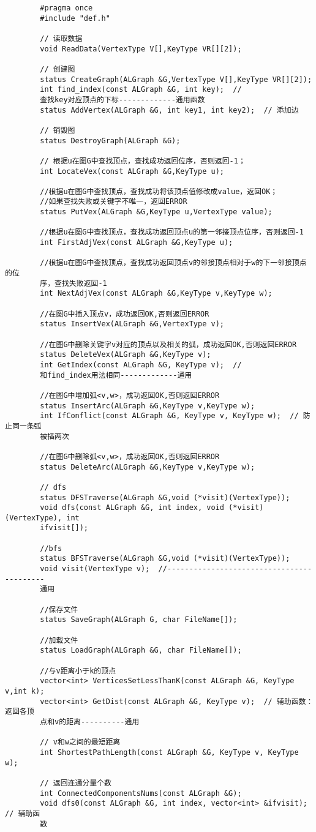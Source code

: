 \documentclass[supercite]{Experimental_Report}
\begin{document}
	\begin{lstlisting}
		#pragma once
		#include "def.h"
		
		// 读取数据
		void ReadData(VertexType V[],KeyType VR[][2]);
		
		// 创建图
		status CreateGraph(ALGraph &G,VertexType V[],KeyType VR[][2]);
		int find_index(const ALGraph &G, int key);  // 
		查找key对应顶点的下标-------------通用函数
		status AddVertex(ALGraph &G, int key1, int key2);  // 添加边
		
		// 销毁图
		status DestroyGraph(ALGraph &G);
		
		// 根据u在图G中查找顶点，查找成功返回位序，否则返回-1；
		int LocateVex(const ALGraph &G,KeyType u);
		
		//根据u在图G中查找顶点，查找成功将该顶点值修改成value，返回OK；
		//如果查找失败或关键字不唯一，返回ERROR
		status PutVex(ALGraph &G,KeyType u,VertexType value);
		
		//根据u在图G中查找顶点，查找成功返回顶点u的第一邻接顶点位序，否则返回-1
		int FirstAdjVex(const ALGraph &G,KeyType u);
		
		//根据u在图G中查找顶点，查找成功返回顶点v的邻接顶点相对于w的下一邻接顶点的位
		序，查找失败返回-1
		int NextAdjVex(const ALGraph &G,KeyType v,KeyType w);
		
		//在图G中插入顶点v，成功返回OK,否则返回ERROR
		status InsertVex(ALGraph &G,VertexType v);
		
		//在图G中删除关键字v对应的顶点以及相关的弧，成功返回OK,否则返回ERROR
		status DeleteVex(ALGraph &G,KeyType v);
		int GetIndex(const ALGraph &G, KeyType v);  // 
		和find_index用法相同-------------通用
		
		//在图G中增加弧<v,w>，成功返回OK,否则返回ERROR
		status InsertArc(ALGraph &G,KeyType v,KeyType w);
		int IfConflict(const ALGraph &G, KeyType v, KeyType w);  // 防止同一条弧
		被插两次
		
		//在图G中删除弧<v,w>，成功返回OK,否则返回ERROR
		status DeleteArc(ALGraph &G,KeyType v,KeyType w);
		
		// dfs
		status DFSTraverse(ALGraph &G,void (*visit)(VertexType));
		void dfs(const ALGraph &G, int index, void (*visit)(VertexType), int 
		ifvisit[]);
		
		//bfs
		status BFSTraverse(ALGraph &G,void (*visit)(VertexType));
		void visit(VertexType v);  //------------------------------------------
		通用
		
		//保存文件
		status SaveGraph(ALGraph G, char FileName[]);
		
		//加载文件
		status LoadGraph(ALGraph &G, char FileName[]);
		
		//与v距离小于k的顶点
		vector<int> VerticesSetLessThanK(const ALGraph &G, KeyType v,int k);
		vector<int> GetDist(const ALGraph &G, KeyType v);  // 辅助函数：返回各顶
		点和v的距离----------通用
		
		// v和w之间的最短距离
		int ShortestPathLength(const ALGraph &G, KeyType v, KeyType w);
		
		// 返回连通分量个数
		int ConnectedComponentsNums(const ALGraph &G);
		void dfs0(const ALGraph &G, int index, vector<int> &ifvisit);  // 辅助函
		数
	\end{lstlisting}
\end{document}
